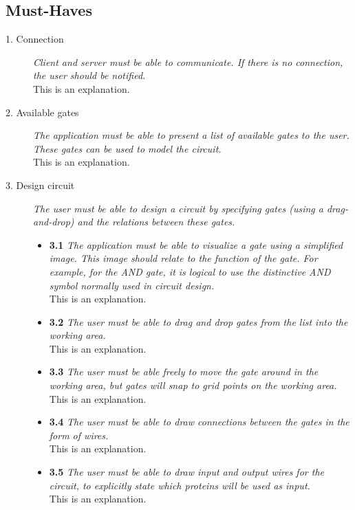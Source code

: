 \documentclass[a4paper]{article}
\begin{document}
\subsection{Must-Haves}
\begin{description}
\item[1. Connection] \textit{Client and server must be able to communicate. If there is no connection, the user should be notified.}\\
This is an explanation.

\item[2. Available gates] \textit{The application must be able to present a list of available gates to the user. These gates can be used to model the circuit.}\\
This is an explanation.

\item[3. Design circuit] \textit{The user must be able to design a circuit by specifying gates (using a drag-and-drop) and the relations between these gates.}
	\begin{itemize}
	\item \textbf{3.1} \textit{The application must be able to visualize a gate using a simplified image. This image should relate to the function of the gate. For example, for the AND gate, it is logical to use the distinctive AND symbol normally used in circuit design.}\\
	This is an explanation.

	\item \textbf{3.2} \textit{The user must be able to drag and drop gates from the list into the working area.}\\
	This is an explanation.

	\item \textbf{3.3} \textit{The user must be able freely to move the gate around in the working area, but gates will snap to grid points on the working area.}\\
	This is an explanation.

	\item \textbf{3.4} \textit{The user must be able to draw connections between the gates in the form of wires.}\\
	This is an explanation.

	\item \textbf{3.5} \textit{The user must be able to draw input and output wires for the circuit, to explicitly state which proteins will be used as input.}\\
	This is an explanation.


\end{itemize}
\end{description}
\end{document}
